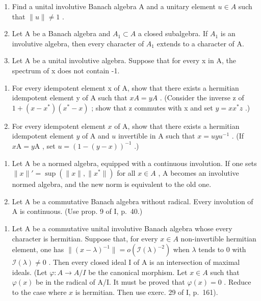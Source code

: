 
\begin{enumerate}
\def\labelenumi{\arabic{enumi})}
\item
  Find a unital involutive Banach algebra A and a unitary element \(u \in A\) such that \(\|u\| \neq 1\) .
\item
  Let A be a Banach algebra and \(A_{1} \subset A\) a closed subalgebra. If \(A_{1}\) is an involutive algebra, then every character of \(A_{1}\) extends to a character of A.
\item
  Let A be a unital involutive algebra. Suppose that for every x in A, the spectrum of x does not contain -1.
\end{enumerate}

\begin{enumerate}
\def\labelenumi{\alph{enumi})}
\item
  For every idempotent element x of A, show that there exists a hermitian idempotent element y of A such that \(xA = yA\) . (Consider the inverse z of \(1 + (x - x^{*})(x^{*} - x)\) ; show that z commutes with x and set \(y = xx^{*}z\) .)
\item
  For every idempotent element \(x\) of A, show that there exists a hermitian idempotent element \(y\) of A and \(u\) invertible in A such that \(x = uyu^{-1}\) . (If \(x\mathrm{A} = y\mathrm{A}\) , set \(u = (1 - (y - x))^{-1}\) .)
\end{enumerate}

\begin{enumerate}
\def\labelenumi{\arabic{enumi})}
\setcounter{enumi}{3}
\item
  Let A be a normed algebra, equipped with a continuous involution. If one sets \(\|x\|' = \sup(\|x\|, \|x^{*}\|)\) for all \(x \in A\) , A becomes an involutive normed algebra, and the new norm is equivalent to the old one.
\item
  Let A be a commutative Banach algebra without radical. Every involution of A is continuous. (Use prop. 9 of I, p.~40.)
\end{enumerate}

\begin{enumerate}
\def\labelenumi{¶ \arabic{enumi})}
\setcounter{enumi}{5}
\tightlist
\item
  Let A be a commutative unital involutive Banach algebra whose every character is hermitian. Suppose that, for every \(x \in A\) non-invertible hermitian element, one has \(\|(x - \lambda)^{-1}\| = o(\mathcal{I}(\lambda)^{-2})\) when \(\lambda\) tends to 0 with \(\mathcal{I}(\lambda) \neq 0\) . Then every closed ideal I of A is an intersection of maximal ideals. (Let \(\varphi: A \longrightarrow A/I\) be the canonical morphism. Let \(x \in A\) such that \(\varphi(x)\) be in the radical of A/I. It must be proved that \(\varphi(x) = 0\) . Reduce to the case where \(x\) is hermitian. Then use exerc. 29 of I, p.~161).
\end{enumerate}

